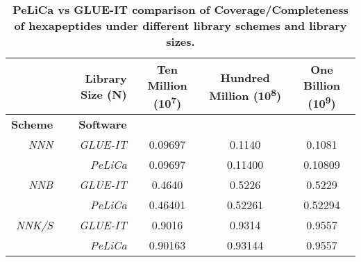 \begin{table}[!ht]
\begin{adjustwidth}{-2.25in}{0in} %
\captionsetup{labelformat=supp}
\caption{\bf PeLiCa vs GLUE-IT comparison of Coverage/Completeness of hexapeptides under different library schemes and library sizes.} 
\centering
\begin{tabular}{|r|r|c|c|c|}
  \hline
& \bf Library Size (N) & \bf Ten Million (10\textsuperscript{7}) & \bf Hundred Million (10\textsuperscript{8}) & \bf One Billion (10\textsuperscript{9}) \\ \hline
\bf Scheme & \bf Software &&& \\ 
  \hline
\it NNN & \it GLUE-IT & 0.09697 & 0.1140\phantom{0} & 0.1081\phantom{0} \\ \cline{2-5}
 &\it PeLiCa & 0.09697 & 0.11400 & 0.10809 \\ \hline
\it  NNB & \it GLUE-IT &  0.4640\phantom{0} & 0.5226\phantom{0} & 0.5229\phantom{0} \\ \cline{2-5} 
   & \it PeLiCa & 0.46401 & 0.52261 & 0.52294 \\ \hline
  \it NNK/S & \it  GLUE-IT & 0.9016\phantom{0} & 0.9314\phantom{0} & 0.9557 \\ \cline{2-5}
   & \it PeLiCa & 0.90163 & 0.93144 & 0.9557 \\ 
   \hline
\end{tabular}
\end{adjustwidth}
\end{table}
